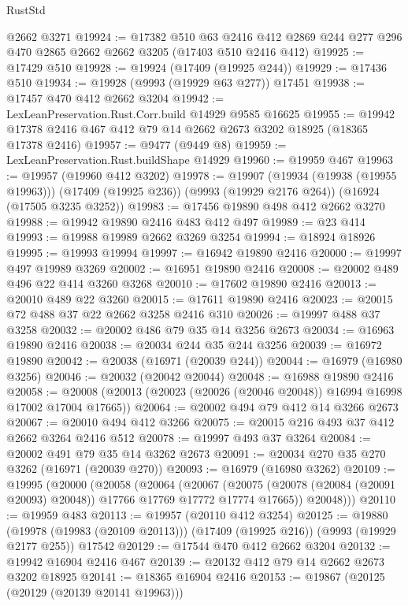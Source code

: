 \begin{lexlean}{RustStd}
\begin{coremodule}
    @2662
    @3271
@19924 := @17382
    @510
    @63
    @2416
    @412
    @2869
    @244
    @277
    @296
    @470
    @2865
    @2662
    @2662
    @3205
    (@17403 @510 @2416 @412)
@19925 := @17429 @510
@19928 := @19924 (@17409 (@19925 @244))
@19929 := @17436 @510
@19934 := @19928 (@9993 (@19929 @63 @277)) @17451
@19938 := @17457 @470 @412 @2662 @3204
@19942 := LexLeanPreservation.Rust.Corr.build @14929 @9585 @16625
@19955 := @19942 @17378 @2416 @467 @412 @79 @14 @2662 @2673 @3202 @18925 (@18365 @17378 @2416)
@19957 := @9477 (@9449 @8)
@19959 := LexLeanPreservation.Rust.buildShape @14929
@19960 := @19959 @467
@19963 := @19957 (@19960 @412 @3202)
@19978 := @19907
    (@19934 (@19938 (@19955 @19963)))
    (@17409 (@19925 @236))
    (@9993 (@19929 @2176 @264))
    (@16924 (@17505 @3235 @3252))
@19983 := @17456 @19890 @498 @412 @2662 @3270
@19988 := @19942 @19890 @2416 @483 @412 @497
@19989 := @23 @414
@19993 := @19988 @19989 @2662 @3269 @3254
@19994 := @18924 @18926
@19995 := @19993 @19994
@19997 := @16942 @19890 @2416
@20000 := @19997 @497 @19989 @3269
@20002 := @16951 @19890 @2416
@20008 := @20002 @489 @496 @22 @414 @3260 @3268
@20010 := @17602 @19890 @2416
@20013 := @20010 @489 @22 @3260
@20015 := @17611 @19890 @2416
@20023 := @20015 @72 @488 @37 @22 @2662 @3258 @2416 @310
@20026 := @19997 @488 @37 @3258
@20032 := @20002 @486 @79 @35 @14 @3256 @2673
@20034 := @16963 @19890 @2416
@20038 := @20034 @244 @35 @244 @3256
@20039 := @16972 @19890
@20042 := @20038 (@16971 (@20039 @244))
@20044 := @16979 (@16980 @3256)
@20046 := @20032 (@20042 @20044)
@20048 := @16988 @19890 @2416
@20058 := @20008 (@20013 (@20023 (@20026 (@20046 @20048)) @16994 @16998 @17002 @17004 @17665))
@20064 := @20002 @494 @79 @412 @14 @3266 @2673
@20067 := @20010 @494 @412 @3266
@20075 := @20015 @216 @493 @37 @412 @2662 @3264 @2416 @512
@20078 := @19997 @493 @37 @3264
@20084 := @20002 @491 @79 @35 @14 @3262 @2673
@20091 := @20034 @270 @35 @270 @3262 (@16971 (@20039 @270))
@20093 := @16979 (@16980 @3262)
@20109 := @19995
    (@20000
      (@20058
        (@20064
          (@20067
            (@20075 (@20078 (@20084 (@20091 @20093) @20048)) @17766 @17769 @17772 @17774 @17665))
          @20048)))
@20110 := @19959 @483
@20113 := @19957 (@20110 @412 @3254)
@20125 := @19880
    (@19978 (@19983 (@20109 @20113)))
    (@17409 (@19925 @216))
    (@9993 (@19929 @2177 @255))
    @17542
@20129 := @17544 @470 @412 @2662 @3204
@20132 := @19942 @16904 @2416 @467
@20139 := @20132 @412 @79 @14 @2662 @2673 @3202 @18925
@20141 := @18365 @16904 @2416
@20153 := @19867
    (@20125 (@20129 (@20139 @20141 @19963)))

\end{coremodule}
\end{lexlean}
